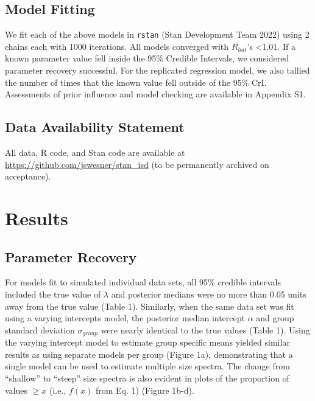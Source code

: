 \documentclass[
  12pt,
]{article}
\begin{document}
\hypertarget{model-fitting}{%
\subsection{Model Fitting}\label{model-fitting}}

We fit each of the above models in \texttt{rstan} (Stan Development Team
2022) using 2 chains each with 1000 iterations. All models converged
with \(R_{hat}\)'s \textless1.01. If a known parameter value fell inside
the 95\% Credible Intervals, we considered parameter recovery
successful. For the replicated regression model, we also tallied the
number of times that the known value fell outside of the 95\% CrI.
Assessments of prior influence and model checking are available in
Appendix S1.

\hypertarget{data-availability-statement}{%
\subsection{Data Availability
Statement}\label{data-availability-statement}}

All data, R code, and Stan code are available at
\url{https://github.com/jswesner/stan_isd} (to be permanently archived
on acceptance).

\hypertarget{results}{%
\section{Results}\label{results}}

\hypertarget{parameter-recovery}{%
\subsection{Parameter Recovery}\label{parameter-recovery}}

For models fit to simulated individual data sets, all 95\% credible
intervals included the true value of \(\lambda\) and posterior medians
were no more than 0.05 units away from the true value (Table 1).
Similarly, when the same data set was fit using a varying intercepts
model, the posterior median intercept \(\alpha\) and group standard
deviation \(\sigma_{group}\) were nearly identical to the true values
(Table 1). Using the varying intercept model to estimate group specific
means yielded similar results as using separate models per group (Figure
1a), demonstrating that a single model can be used to estimate multiple
size spectra. The change from ``shallow'' to ``steep'' size spectra is
also evident in plots of the proportion of values \(\ge x\) (i.e.,
\(f(x)\) from Eq. 1) (Figure 1b-d).
\end{document}
